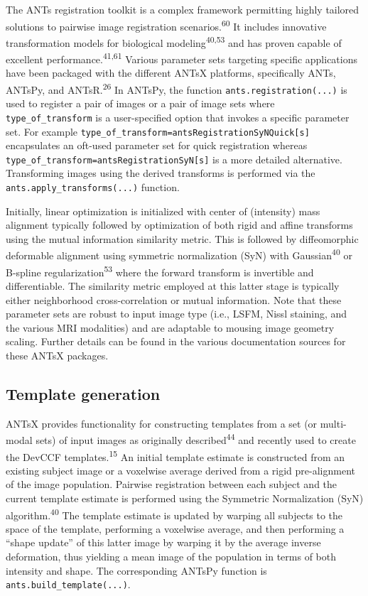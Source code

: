 \documentclass[
  12pt,
]{article}
\begin{document}
The ANTs registration toolkit is a complex framework permitting highly
tailored solutions to pairwise image registration
scenarios.\textsuperscript{60} It includes innovative transformation
models for biological modeling\textsuperscript{40,53} and has proven
capable of excellent performance.\textsuperscript{41,61} Various
parameter sets targeting specific applications have been packaged with
the different ANTsX platforms, specifically ANTs, ANTsPy, and
ANTsR.\textsuperscript{26} In ANTsPy, the function
\texttt{ants.registration(...)} is used to register a pair of images or
a pair of image sets where \texttt{type\_of\_transform} is a
user-specified option that invokes a specific parameter set. For example
\texttt{type\_of\_transform=\textquotesingle{}antsRegistrationSyNQuick{[}s{]}\textquotesingle{}}
encapsulates an oft-used parameter set for quick registration whereas
\texttt{type\_of\_transform=\textquotesingle{}antsRegistrationSyN{[}s{]}\textquotesingle{}}
is a more detailed alternative. Transforming images using the derived
transforms is performed via the \texttt{ants.apply\_transforms(...)}
function.

Initially, linear optimization is initialized with center of (intensity)
mass alignment typically followed by optimization of both rigid and
affine transforms using the mutual information similarity metric. This
is followed by diffeomorphic deformable alignment using symmetric
normalization (SyN) with Gaussian\textsuperscript{40} or B-spline
regularization\textsuperscript{53} where the forward transform is
invertible and differentiable. The similarity metric employed at this
latter stage is typically either neighborhood cross-correlation or
mutual information. Note that these parameter sets are robust to input
image type (i.e., LSFM, Nissl staining, and the various MRI modalities)
and are adaptable to mousing image geometry scaling. Further details can
be found in the various documentation sources for these ANTsX packages.

\hypertarget{template-generation}{%
\subsection*{Template generation}\label{template-generation}}

ANTsX provides functionality for constructing templates from a set (or
multi-modal sets) of input images as originally
described\textsuperscript{44} and recently used to create the DevCCF
templates.\textsuperscript{15} An initial template estimate is
constructed from an existing subject image or a voxelwise average
derived from a rigid pre-alignment of the image population. Pairwise
registration between each subject and the current template estimate is
performed using the Symmetric Normalization (SyN)
algorithm.\textsuperscript{40} The template estimate is updated by
warping all subjects to the space of the template, performing a
voxelwise average, and then performing a ``shape update'' of this latter
image by warping it by the average inverse deformation, thus yielding a
mean image of the population in terms of both intensity and shape. The
corresponding ANTsPy function is \texttt{ants.build\_template(...)}.
\end{document}
